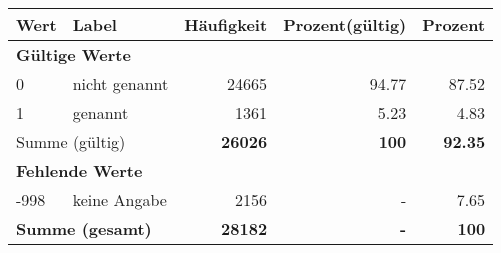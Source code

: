      \begin{longtable}{lXrrr}
     \toprule
     \textbf{Wert} & \textbf{Label} & \textbf{Häufigkeit} & \textbf{Prozent(gültig)} & \textbf{Prozent} \\
     \endhead
     \midrule
     \multicolumn{5}{l}{\textbf{Gültige Werte}}\\

     0 &
     \multicolumn{1}{X}{ nicht genannt   } &


       \num{24665} &
       \num[round-mode=places,round-precision=2]{94,77} &
         \num[round-mode=places,round-precision=2]{87,52} \\

     1 &
     \multicolumn{1}{X}{ genannt   } &


       \num{1361} &
       \num[round-mode=places,round-precision=2]{5,23} &
         \num[round-mode=places,round-precision=2]{4,83} \\
     \midrule
     \multicolumn{2}{l}{Summe (gültig)} &
       \textbf{\num{26026}} &
     \textbf{100} &
       \textbf{\num[round-mode=places,round-precision=2]{92,35}} \\
     \multicolumn{5}{l}{\textbf{Fehlende Werte}}\\
       -998 &
       keine Angabe &
         \num{2156} &
        - &
         \num[round-mode=places,round-precision=2]{7,65} \\
     \midrule
     \multicolumn{2}{l}{\textbf{Summe (gesamt)}} &
          \textbf{\num{28182}} &
        \textbf{-} &
        \textbf{100} \\
     \bottomrule
     \end{longtable}
     
